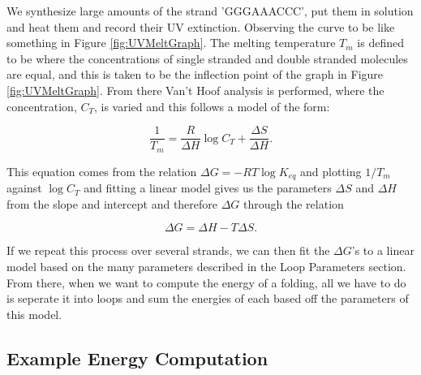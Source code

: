 We synthesize large amounts of the strand 'GGGAAACCC', put them in
solution and heat them and record their UV extinction. Observing the
curve to be like something in Figure \ref{fig:UVMeltGraph}. The
melting temperature $T_m$ is defined to be where the concentrations of
single stranded and double stranded molecules are equal, and this is
taken to be the inflection point of the graph in Figure
\ref{fig:UVMeltGraph}. From there Van't Hoof analysis is performed,
where the concentration, $C_T$, is varied and this follows a model of
the form:

\begin{equation}
  \frac{1}{T_m} = \frac{R}{\Delta H} \log{C_T} + \frac{\Delta S}{\Delta H}.
\end{equation}

This equation comes from the relation $\Delta G = -RT \log{K_{eq}}$
and plotting $1/T_m$ against $\log{C_T}$ and fitting a linear model
gives us the parameters $\Delta S$ and $\Delta H$ from the slope and
intercept and therefore $\Delta G$ through the relation

\begin{equation}
\Delta G = \Delta H - T \Delta S.
\end{equation}

If we repeat this process over several strands, we can then fit the
$\Delta G$'s to a linear model based on the many parameters described
in the Loop Parameters section. From there, when we want to compute
the energy of a folding, all we have to do is seperate it into loops
and sum the energies of each based off the parameters of this model.


%
%

\subsection{Example Energy Computation}


